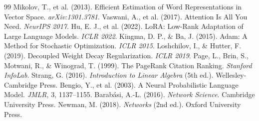 \begin{thebibliography}{99}
 Mikolov, T., et al. (2013). Efficient Estimation of Word Representations in Vector Space. \textit{arXiv:1301.3781}. 
 Vaswani, A., et al. (2017). Attention Is All You Need. \textit{NeurIPS 2017}. 
 Hu, E. J., et al. (2022). LoRA: Low-Rank Adaptation of Large Language Models. \textit{ICLR 2022}. 
 Kingma, D. P., \& Ba, J. (2015). Adam: A Method for Stochastic Optimization. \textit{ICLR 2015}. 
 Loshchilov, I., \& Hutter, F. (2019). Decoupled Weight Decay Regularization. \textit{ICLR 2019}. 
 Page, L., Brin, S., Motwani, R., \& Winograd, T. (1999). The PageRank Citation Ranking. \textit{Stanford InfoLab}.
 Strang, G. (2016). \textit{Introduction to Linear Algebra} (5th ed.). Wellesley-Cambridge Press.
 Bengio, Y., et al. (2003). A Neural Probabilistic Language Model. \textit{JMLR}, 3, 1137--1155. 
 Barabási, A.-L. (2016). \textit{Network Science}. Cambridge University Press.
 Newman, M. (2018). \textit{Networks} (2nd ed.). Oxford University Press.
\end{thebibliography}
